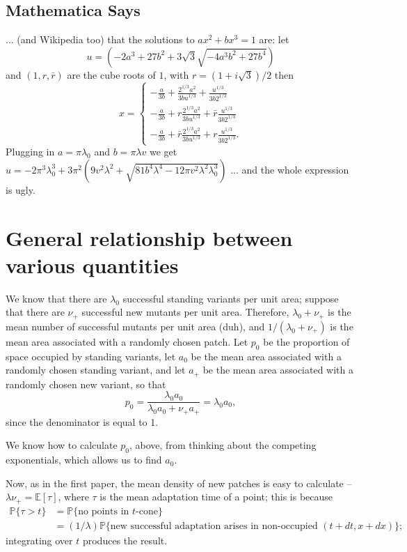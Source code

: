 \documentclass{article}
\renewcommand{\P}{\mathbb{P}}
\newcommand{\E}{\mathbb{E}}
\begin{document}
\subsection{Mathematica Says}

... (and Wikipedia too) that the solutions to $ax^2 + bx^3 = 1$ are:
let 
\[
   u = \left( -2a^3 + 27b^2 + 3 \sqrt{3} \sqrt{ -4a^3b^2+27b^4} \right)
\]
and $(1, r, \bar r)$ are the cube roots of $1$, with $r=(1+i\sqrt{3})/2$ then
\[
    x = \begin{cases} 
        -\frac{a}{3b} + \frac{ 2^{1/3} a^2 }{ 3 b u^{1/3} } + \frac{ u^{1/3} }{ 3 b 2^{1/3} } \\
        -\frac{a}{3b} + r \frac{ 2^{1/3} a^2 }{ 3 b u^{1/3} } + \bar r \frac{ u^{1/3} }{ 3 b 2^{1/3} } \\
        -\frac{a}{3b} + \bar r \frac{ 2^{1/3} a^2 }{ 3 b u^{1/3} } + r \frac{ u^{1/3} }{ 3 b 2^{1/3} }  .
    \end{cases}
\]
Plugging in $a=\pi \lambda_0$ and $b=\pi \lambda v$ we get
$u = - 2 \pi^3 \lambda_0^3 + 3 \pi^2 \left( 9 v^2 \lambda^2 + \sqrt{ 81 b^4 \lambda^4 - 12 \pi v^2 \lambda^2 \lambda_0^3 } \right)$
... and the whole expression is ugly.

\section{General relationship between various quantities}

We know that there are $\lambda_0$ successful standing variants per unit area;
suppose that there are $\nu_+$ successful new mutants per unit area.
Therefore, $\lambda_0+\nu_+$ is the mean number of successful mutants per unit area (duh),
and $1/(\lambda_0+\nu_+)$ is the mean area associated with a randomly chosen patch.
Let $p_0$ be the proportion of space occupied by standing variants, 
let $a_0$ be the mean area associated with a randomly chosen standing variant,
and let $a_+$ be the mean area associated with a randomly chosen new variant,
so that
\[
    p_0 = \frac{ \lambda_0 a_0 }{ \lambda_0 a_0 + \nu_+ a_+ } = \lambda_0 a_0 ,
\]
since the denominator is equal to 1.

We know how to calculate $p_0$, above, from thinking about the competing exponentials,
which allows us to find $a_0$.

Now, as in the first paper, the mean density of new patches is easy to calculate -- 
$\lambda \nu_+ = \E[\tau]$, where $\tau$ is the mean adaptation time of a point;
this is because 
\begin{align*}
    \P\{ \tau > t \} &= \P\{ \mbox{no points in $t$-cone} \} \\
            &= (1/\lambda) \P\{ \mbox{new successful adaptation arises in non-occupied $(t+dt,x+dx)$} \} ;
\end{align*}
integrating over $t$ produces the result.
\end{document}

